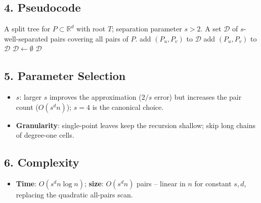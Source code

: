 \subsection{4. Pseudocode}

\begin{algorithm}[htbp]
\caption{Well-Separated Pair Decomposition from a Split Tree}
\label{alg:approx_wspd_build}
\begin{algorithmic}[1]
\Require A split tree for $P \subset \mathbb{R}^d$ with root $T$; separation parameter $s > 2$.
\Ensure A set $\mathcal{D}$ of $s$-well-separated pairs covering all pairs of $P$.
   \State add $(P_u, P_v)$ to $\mathcal{D}$
   \State add $(P_u, P_v)$ to $\mathcal{D}$
     \State {} \EndFor
  \Else {} \State {} \EndFor \EndIf
\EndFunction
\State $\mathcal{D} \gets \emptyset$
 \State {} \EndFor
\State \Return $\mathcal{D}$
\end{algorithmic}
\end{algorithm}

\subsection{5. Parameter Selection}

\begin{itemize}
\item \textbf{$s$}: larger $s$ improves the approximation ($2/s$ error) but
  increases the pair count ($O(s^d n)$); $s = 4$ is the canonical choice.
\item \textbf{Granularity}: single-point leaves keep the recursion shallow;
  skip long chains of degree-one cells.
\end{itemize}

\subsection{6. Complexity}

\begin{itemize}
\item \textbf{Time}: $O(s^d n \log n)$; \textbf{size}: $O(s^d n)$ pairs --
  linear in $n$ for constant $s, d$, replacing the quadratic all-pairs scan.
\end{itemize}

